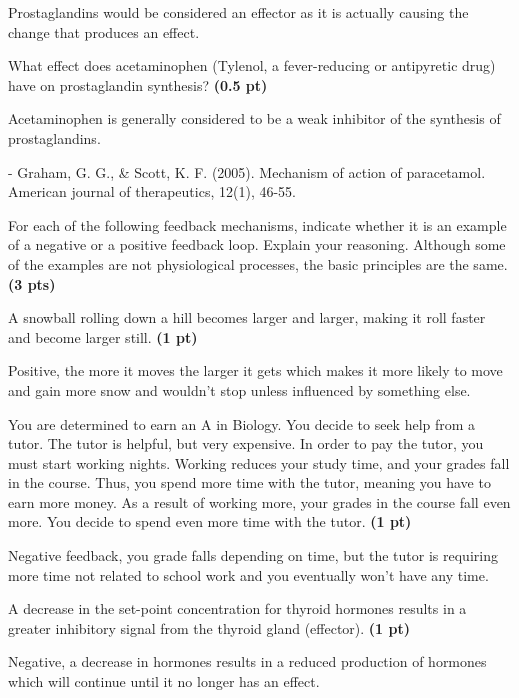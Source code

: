 \documentclass[12pt,a4paper]{article}
\begin{document}
\begin{enumerate}[font=\bfseries, wide]
\begin{enumerate}[font=\bfseries, wide]
        Prostaglandins would be considered an effector as it is actually causing the change that produces an effect.

        {\color{under}\item What effect does acetaminophen (Tylenol, a fever-reducing or antipyretic drug) have on prostaglandin synthesis? \textbf{(0.5 pt)}}

        Acetaminophen is generally considered to be a weak inhibitor of the synthesis of prostaglandins. 

        - Graham, G. G., \& Scott, K. F. (2005). Mechanism of action of paracetamol. American journal of therapeutics, 12(1), 46-55.

    \end{enumerate}
    {\color{under}\item For each of the following feedback mechanisms, indicate whether it is an example of a negative or a positive feedback loop. Explain your reasoning. Although some of the examples are not physiological processes, the basic principles are the same. \textbf{(3 pts)}}
    \begin{enumerate}[font=\bfseries, wide]
        {\color{under}\item A snowball rolling down a hill becomes larger and larger, making it roll faster and become larger still. \textbf{(1 pt)}}

        Positive, the more it moves the larger it gets which makes it more likely to move and gain more snow and wouldn't stop unless influenced by something else.

        {\color{under}\item  You are determined to earn an A in Biology. You decide to seek help from a tutor. The tutor is helpful, but very expensive. In order to pay the tutor, you must start working nights. Working reduces your study time, and your grades fall in the course. Thus, you spend more time with the tutor, meaning you have to earn more money. As a result of working more, your grades in the course fall even more. You decide to spend even more time with the tutor. \textbf{(1 pt)}}

        Negative feedback, you grade falls depending on time, but the tutor is requiring more time not related to school work and you eventually won't have any time.

        {\color{under}\item A decrease in the set-point concentration for thyroid hormones results in a greater inhibitory signal from the thyroid gland (effector). \textbf{(1 pt)}}

        Negative, a decrease in hormones results in a reduced production of hormones which will continue until it no longer has an effect.
    \end{enumerate}
\end{enumerate}
\newpage 
\end{document}
